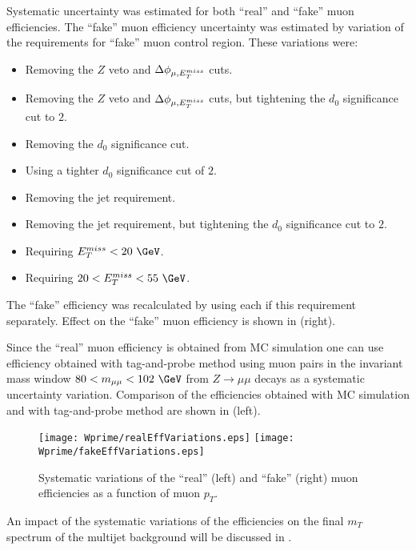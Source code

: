 Systematic uncertainty was estimated for both ``real'' and ``fake'' muon efficiencies.
The ``fake'' muon efficiency uncertainty was estimated by variation of the requirements for ``fake'' muon control region. These variations were:
\begin{itemize}
\item Removing the $Z$ veto and $\Delta\phi_{\mu,E_T^{miss}}$ cuts.
\item Removing the $Z$ veto and $\Delta\phi_{\mu,E_T^{miss}}$ cuts, but tightening the $d_0$ significance cut to $2$.
\item Removing the $d_0$ significance cut. 
\item Using a tighter $d_0$ significance cut of $2$.
\item Removing the jet requirement.
\item Removing the jet requirement, but tightening the $d_0$ significance
cut to $2$.
\item Requiring $\met < 20~\GeV$.
\item Requiring $20 < \met < 55~\GeV$.
\end{itemize}
The ``fake'' efficiency was recalculated by using each if this requirement separately.
Effect on the ``fake'' muon efficiency is shown in  (right).

Since the ``real'' muon efficiency is obtained from MC simulation one can use efficiency obtained with tag-and-probe method using muon pairs in the invariant mass window $80 < m_{\mu\mu} < 102~\GeV$ from $Z\to\mu\mu$ decays as a systematic uncertainty variation. 
Comparison of the efficiencies obtained with MC simulation and with tag-and-probe method are shown in  (left).

\begin{figure}[]
  \centering
  \texttt{[image: Wprime/realEffVariations.eps]}
  \texttt{[image: Wprime/fakeEffVariations.eps]}
  \caption{Systematic variations of the ``real'' (left) and ``fake'' (right) muon efficiencies as a function of muon $p_T$.}
  \label{fig:matrix_method_systematics}
\end{figure}

An impact of the systematic variations of the efficiencies on the final $m_T$ spectrum of the multijet background will be discussed in .



